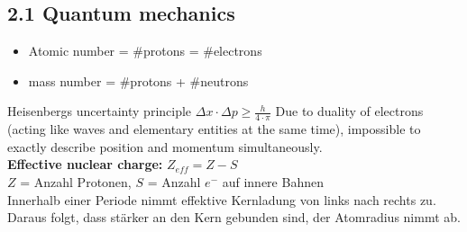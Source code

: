 \begin{multicols*}{4}
\subsection{2.1 Quantum mechanics}{
    \begin{itemize}[noitemsep, leftmargin=*]
        \item Atomic number = \#protons = \#electrons
        \item mass number = \#protons + \#neutrons
    \end{itemize}
    Heisenbergs uncertainty principle $\Delta x \cdot \Delta p \geq \frac{h}{4 \cdot \pi}$ Due to duality of electrons (acting like waves and elementary entities at the same time), impossible to exactly describe position and momentum simultaneously.\\
    \textbf{Effective nuclear charge:}   $Z_{eff} = Z-S$\\
    $Z$ = Anzahl Protonen, $S$ = Anzahl $e^-$ auf innere Bahnen
    \vspace{1mm}\\
    Innerhalb einer Periode nimmt effektive Kernladung von links nach rechts zu. Daraus folgt, dass   stärker an den Kern gebunden sind, der Atomradius nimmt ab. 
}



\end{multicols*}
